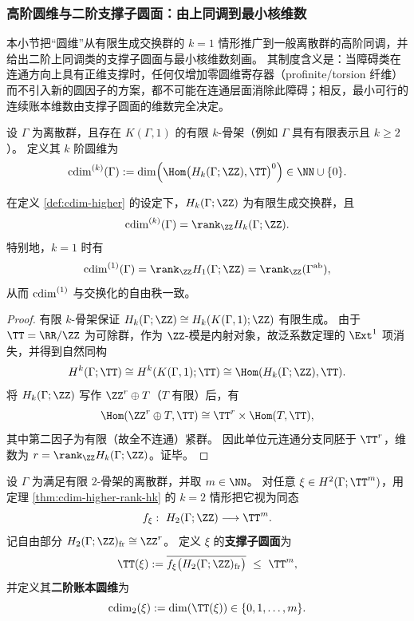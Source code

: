 \subsubsection{高阶圆维与二阶支撑子圆面：由上同调到最小核维数}\label{subsubsec:cdim-higher-cdim-ledger}
本小节把“圆维”从有限生成交换群的 \(k=1\) 情形推广到一般离散群的高阶同调，并给出二阶上同调类的支撑子圆面与最小核维数刻画。
其制度含义是：当障碍类在连通方向上具有正维支撑时，任何仅增加零圆维寄存器（profinite/torsion 纤维）而不引入新的圆因子的方案，都不可能在连通层面消除此障碍；相反，最小可行的连续账本维数由支撑子圆面的维数完全决定。

\begin{definition}[高阶圆维]\label{def:cdim-higher}
设 \(\Gamma\) 为离散群，且存在 \(K(\Gamma,1)\) 的有限 \(k\)-骨架（例如 \(\Gamma\) 具有有限表示且 \(k\ge 2\)）。
定义其 \(k\) 阶圆维为
\[
\cdim^{(k)}(\Gamma):=\dim\Bigl(\Hom\bigl(H_k(\Gamma;\ZZ),\TT\bigr)^0\Bigr)\in\NN\cup\{0\}.
\]
\end{definition}

\begin{theorem}[高阶圆维的秩刻画]\label{thm:cdim-higher-rank-hk}
在定义 \ref{def:cdim-higher} 的设定下，\(H_k(\Gamma;\ZZ)\) 为有限生成交换群，且
\[
\cdim^{(k)}(\Gamma)=\rank_{\ZZ}H_k(\Gamma;\ZZ).
\]
特别地，\(k=1\) 时有
\[
\cdim^{(1)}(\Gamma)=\rank_{\ZZ}H_1(\Gamma;\ZZ)=\rank_{\ZZ}(\Gamma^{\mathrm{ab}}),
\]
从而 \(\operatorname{cdim}^{(1)}\) 与交换化的自由秩一致。
\end{theorem}
\begin{proof}
有限 \(k\)-骨架保证 \(H_k(\Gamma;\ZZ)\cong H_k(K(\Gamma,1);\ZZ)\) 有限生成。
由于 \(\TT=\RR/\ZZ\) 为可除群，作为 \(\ZZ\)-模是内射对象，故泛系数定理的 \(\Ext^1\) 项消失，并得到自然同构
\[
H^k(\Gamma;\TT)\cong H^k(K(\Gamma,1);\TT)\cong \Hom(H_k(\Gamma;\ZZ),\TT).
\]
将 \(H_k(\Gamma;\ZZ)\) 写作 \(\ZZ^r\oplus T\)（\(T\) 有限）后，有
\[
\Hom(\ZZ^r\oplus T,\TT)\cong \TT^r\times \Hom(T,\TT),
\]
其中第二因子为有限（故全不连通）紧群。
因此单位元连通分支同胚于 \(\TT^r\)，维数为 \(r=\rank_{\ZZ}H_k(\Gamma;\ZZ)\)。证毕。
\end{proof}

\begin{definition}[二阶支撑子圆面与最小核维数]\label{def:cdim2-support-torus}
设 \(\Gamma\) 为满足有限 \(2\)-骨架的离散群，并取 \(m\in\NN\)。
对任意
\(
\xi\in H^2(\Gamma;\TT^m)
\)，用定理 \ref{thm:cdim-higher-rank-hk} 的 \(k=2\) 情形把它视为同态
\[
f_\xi:\ H_2(\Gamma;\ZZ)\longrightarrow \TT^m.
\]
记自由部分 \(H_2(\Gamma;\ZZ)_{\mathrm{fr}}\cong \ZZ^r\)。
定义 \(\xi\) 的\textbf{支撑子圆面}为
\[
\TT(\xi):=\overline{f_\xi\bigl(H_2(\Gamma;\ZZ)_{\mathrm{fr}}\bigr)}\ \le\ \TT^m,
\]
并定义其\textbf{二阶账本圆维}为
\[
\cdim_2(\xi):=\dim(\TT(\xi))\in\{0,1,\dots,m\}.
\]
\end{definition}

